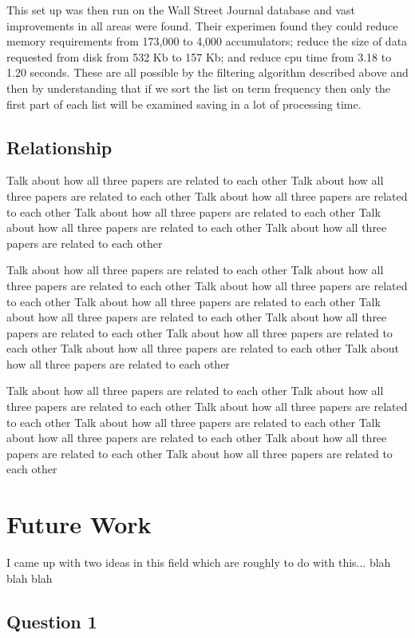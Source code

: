 \documentclass{acm_proc_article-sp}
\begin{document}
This set up was then run on the Wall Street Journal database and vast improvements in all areas were found. Their experimen found they could reduce memory requirements from 173,000 to 4,000 accumulators; reduce the size of data requested from disk from 532 Kb to 157 Kb; and reduce cpu time from 3.18 to 1.20 seconds. These are all possible by the filtering algorithm described above and then by understanding that if we sort the list on term frequency then only the first part of each list will be examined saving in a lot of processing time.

\subsection{Relationship}
Talk about how all three papers are related to each other
Talk about how all three papers are related to each other
Talk about how all three papers are related to each other
Talk about how all three papers are related to each other
Talk about how all three papers are related to each other
Talk about how all three papers are related to each other

Talk about how all three papers are related to each other
Talk about how all three papers are related to each other
Talk about how all three papers are related to each other
Talk about how all three papers are related to each other
Talk about how all three papers are related to each other
Talk about how all three papers are related to each other
Talk about how all three papers are related to each other
Talk about how all three papers are related to each other
Talk about how all three papers are related to each other

Talk about how all three papers are related to each other
Talk about how all three papers are related to each other
Talk about how all three papers are related to each other
Talk about how all three papers are related to each other
Talk about how all three papers are related to each other
Talk about how all three papers are related to each other
Talk about how all three papers are related to each other

\section{Future Work}
I came up with two ideas in this field which are roughly to do with this... blah blah blah

\subsection{Question 1}
\end{document}
